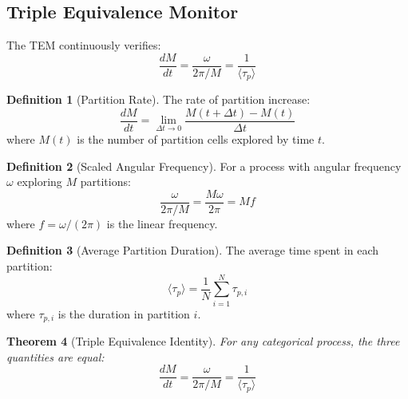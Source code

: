 \documentclass[twocolumn,10pt]{article}
\newtheorem{theorem}{Theorem}[section]
\theoremstyle{definition}
\newtheorem{definition}[theorem]{Definition}
\theoremstyle{remark}
\begin{document}
\subsection{Triple Equivalence Monitor}

The TEM continuously verifies:
\begin{equation}
    \frac{dM}{dt} = \frac{\omega}{2\pi/M} = \frac{1}{\langle \tau_p \rangle}
\end{equation}

\begin{definition}[Partition Rate]
The rate of partition increase:
\begin{equation}
    \frac{dM}{dt} = \lim_{\Delta t \to 0} \frac{M(t + \Delta t) - M(t)}{\Delta t}
\end{equation}
where $M(t)$ is the number of partition cells explored by time $t$.
\end{definition}

\begin{definition}[Scaled Angular Frequency]
For a process with angular frequency $\omega$ exploring $M$ partitions:
\begin{equation}
    \frac{\omega}{2\pi/M} = \frac{M \omega}{2\pi} = M f
\end{equation}
where $f = \omega/(2\pi)$ is the linear frequency.
\end{definition}

\begin{definition}[Average Partition Duration]
The average time spent in each partition:
\begin{equation}
    \langle \tau_p \rangle = \frac{1}{N} \sum_{i=1}^{N} \tau_{p,i}
\end{equation}
where $\tau_{p,i}$ is the duration in partition $i$.
\end{definition}

\begin{theorem}[Triple Equivalence Identity]
\label{thm:triple_identity}
For any categorical process, the three quantities are equal:
\begin{equation}
    \frac{dM}{dt} = \frac{\omega}{2\pi/M} = \frac{1}{\langle \tau_p \rangle}
\end{equation}
\end{theorem}
\end{document}
